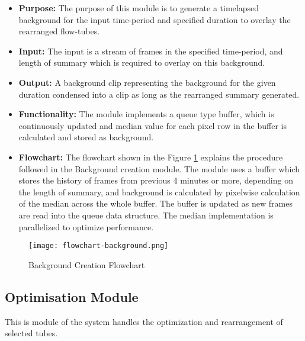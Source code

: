     \begin{itemize}
        \item \textbf{Purpose:} The purpose of this module is to generate a timelapsed background for the input time-period and specified duration to overlay the rearranged flow-tubes.
        \item \textbf{Input:} The input is a stream of frames in the specified time-period, and length of summary which is required to overlay on this background.
        \item \textbf{Output:} A background clip representing the background for the given duration condensed into a clip as long as the rearranged summary generated.
        \item \textbf{Functionality:} The module implements a queue type buffer, which is continuously updated and median value for each pixel row in the buffer is calculated and stored as background.
        \item \textbf{Flowchart:} The flowchart shown in the Figure \ref{img:flowchart-background} explains the procedure followed in the Background creation module. The module uses a buffer which stores the history of  frames from previous 4 minutes or more, depending on the length of summary, and background is calculated by pixelwise calculation of the median across the whole buffer. The buffer is updated as new frames are read into the queue data structure. The median implementation is parallelized to optimize performance.
    \end{itemize}

    \begin{figure}[H]
        \centering
        \texttt{[image: flowchart-background.png]}
        \caption{Background Creation Flowchart}
        \label{img:flowchart-background}
    \end{figure}


    \subsection{Optimisation Module}
    This is module of the system handles the optimization and rearrangement of selected tubes.

